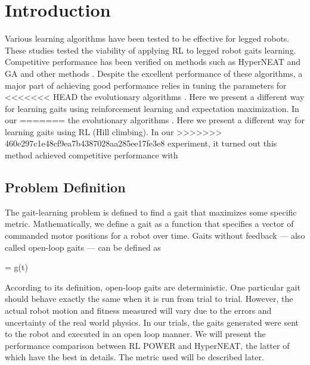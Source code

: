 \section{Introduction}


Various learning algorithms have been tested to be effective for
legged robots. These studies tested the viability of applying RL to legged robot gaits learning. Competitive performance has
been verified on methods such as HyperNEAT \cite{yosinski2011evolving-robot-gaits} and
GA \cite{chernova2004an-evolutionary-approach-to-gait} and other methods \cite{hornby2005autonomous-evolution-of-dynamic} \cite{zykov2004evolving-dynamic-gaits} \cite{tellez2006evolving-the-walking-behaviour} \cite{valsalam2008modular-neuroevolution-for-multilegged}. Despite the excellent performance of these algorithms, a major
part of achieving good performance relies in tuning the parameters for
<<<<<<< HEAD
the evolutionary algorithms \cite{kormushev2011bipedal-walking-energya}. Here we present a
different way for learning gaits using reinforcement learning and expectation maximization. In our
=======
the evolutionary algorithms \cite{kormushev2011bipedal-walking-energy}. Here we present a
different way for learning gaits using RL (Hill climbing). In our
>>>>>>> 460e297c1e48cf9ea7b4387028aa285ee17fe3e8
experiment, it turned out this method achieved competitive performance
with 

\subsection{Problem Definition}
The gait-learning problem is defined to find a
gait that maximizes some specific metric. Mathematically, we define a
gait as a function that specifies a vector of commanded motor
positions for a robot over time. Gaits without feedback --- also
called open-loop gaits --- can be defined as

\be{} = g(t)\ee

According to its definition, open-loop gaits are deterministic. One
particular gait should behave exactly the same when it is run from
trial to trial. However, the actual robot motion and fitness measured
will vary due to the errors and uncertainty of the real world physics. In our
trials, the gaits generated were sent to the robot and
executed in an open loop manner. We will present the performance comparison between
RL POWER and HyperNEAT, the latter of which have the best in details. The metric used will be
described later.
